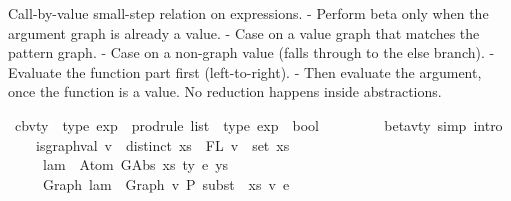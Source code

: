 \begin{isabellebody}
{\isafolddocument}%
%
\isadelimdocument
%
\endisadelimdocument
%
\begin{isamarkuptext}%
Call-by-value small-step relation on expressions.
- Perform beta only when the argument graph is already a value.
- Case on a value graph that matches the pattern graph.
- Case on a non-graph value (falls through to the else branch).
- Evaluate the function part first (left-to-right).
- Then evaluate the argument, once the function is a value.
No reduction happens inside abstractions.%
\end{isamarkuptext}\isamarkuptrue%
\isamarkupfalse%
\ cbv{\isacharunderscore}{\kern0pt}ty\ {\isacharcolon}{\kern0pt}{\isacharcolon}{\kern0pt}\ {\isachardoublequoteopen}type\ exp\ {\isacharequal}{\kern0pt}{\isachargreater}{\kern0pt}\ prodrule\ list\ {\isacharequal}{\kern0pt}{\isachargreater}{\kern0pt}\ type\ exp\ {\isacharequal}{\kern0pt}{\isachargreater}{\kern0pt}\ bool{\isachardoublequoteclose}\isanewline
\ \ {\isacharparenleft}{\kern0pt}{\isachardoublequoteopen}{\isacharunderscore}{\kern0pt}\ {\isacharminus}{\kern0pt}{\isachargreater}{\kern0pt}{\isacharbraceleft}{\kern0pt}{\isacharunderscore}{\kern0pt}{\isacharbraceright}{\kern0pt}\ {\isacharunderscore}{\kern0pt}{\isachardoublequoteclose}\ {\isacharbrackleft}{\kern0pt}{}{}{\isacharcomma}{\kern0pt}{}{\isacharcomma}{\kern0pt}{}{}{\isacharbrackright}{\kern0pt}\ {}{}{\isacharparenright}{\kern0pt}\isanewline
{}\isanewline
\ \ beta{\isacharunderscore}{\kern0pt}v{\isacharunderscore}{\kern0pt}ty\ {\isacharbrackleft}{\kern0pt}simp{\isacharcomma}{\kern0pt}\ intro{\isacharbrackright}{\kern0pt}{\isacharcolon}{\kern0pt}\isanewline
\ \ \ \ {\isachardoublequoteopen}is{\isacharunderscore}{\kern0pt}graph{\isacharunderscore}{\kern0pt}val\ v\ {\isacharequal}{\kern0pt}{\isacharequal}{\kern0pt}{\isachargreater}{\kern0pt}\ distinct\ xs\ {\isacharequal}{\kern0pt}{\isacharequal}{\kern0pt}{\isachargreater}{\kern0pt}\ FL\ v\ {\isacharequal}{\kern0pt}\ set\ xs\ {\isacharequal}{\kern0pt}{\isacharequal}{\kern0pt}{\isachargreater}{\kern0pt}\isanewline
\ \ \ \ \ lam\ {\isasymsimeq}\ Atom\ {\isacharparenleft}{\kern0pt}GAbs\ xs\ ty\ e{\isacharparenright}{\kern0pt}\ ys\ {\isacharequal}{\kern0pt}{\isacharequal}{\kern0pt}{\isachargreater}{\kern0pt}\isanewline
\ \ \ \ \ Graph\ lam\ {\isasymcdot}\ Graph\ v\ {\isacharminus}{\kern0pt}{\isachargreater}{\kern0pt}{\isacharbraceleft}{\kern0pt}P{\isacharbraceright}{\kern0pt}\ subst\ {}\ xs\ v\ e{\isachardoublequoteclose}\isanewline

\end{isabellebody}
